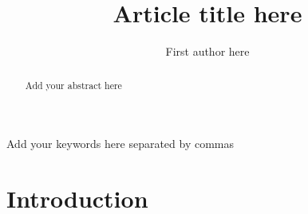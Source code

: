\documentclass{JASSS}
\title{Article title here}
\author[1]{First author here}
\affil[1]{Affiliation of the first author here}
\begin{document}
\maketitle 



\begin{abstract}
Add your abstract here
\end{abstract}

\begin{keywords}
Add your keywords here separated by commas
\end{keywords}

\parano{}



\section{Introduction}




\end{document}
